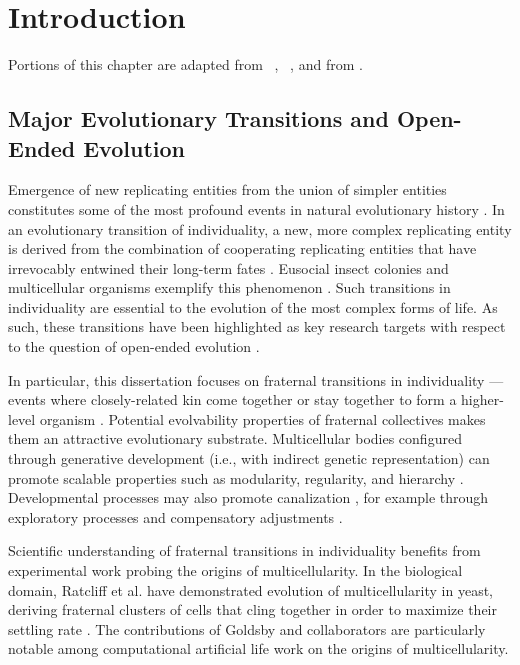 \chapter{Introduction}
\label{ch:introduction}

\noindent
Portions of this chapter are adapted from ~\citep{moreno2019toward}, ~\citep{moreno2020practical}, and from \citep{moreno2020profiling}.

\section{Major Evolutionary Transitions and Open-Ended Evolution}

Emergence of new replicating entities from the union of simpler entities constitutes some of the most profound events in natural evolutionary history \citep{smith1997major}.
In an evolutionary transition of individuality, a new, more complex replicating entity is derived from the combination of cooperating replicating entities that have irrevocably entwined their long-term fates \citep{west2015major}.
Eusocial insect colonies and multicellular organisms exemplify this phenomenon \citep{smith1997major}.
Such transitions in individuality are essential to the evolution of the most complex forms of life.
As such, these transitions have been highlighted as key research targets with respect to the question of open-ended evolution \citep{ray1996evolving, banzhaf2016defining}.

In particular, this dissertation focuses on fraternal transitions in individuality --- events where closely-related kin come together or stay together to form a higher-level organism \citep{queller1997cooperators}.
Potential evolvability properties of fraternal collectives makes them an attractive evolutionary substrate.
Multicellular bodies configured through generative development (i.e., with indirect genetic representation) can promote scalable properties \citep{lipson2007principles} such as modularity, regularity, and hierarchy \citep{hornby2005measuring, clune2011performance}.
Developmental processes may also promote canalization \citep{stanley2003taxonomy}, for example through exploratory processes and compensatory adjustments \citep{gerhart2007theory}.

Scientific understanding of fraternal transitions in individuality benefits from experimental work probing the origins of multicellularity.
In the biological domain, Ratcliff et al. have demonstrated evolution of multicellularity in yeast, deriving fraternal clusters of cells that cling together in order to maximize their settling rate \citep{ratcliff2012experimental}.
The contributions of Goldsby and collaborators are particularly notable among computational artificial life work on the origins of multicellularity.

